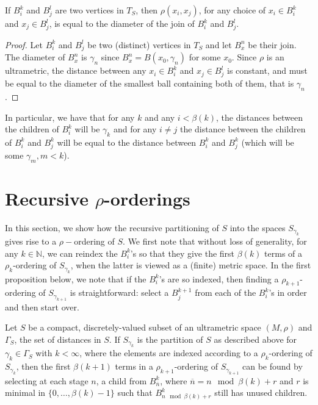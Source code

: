 \begin{lemma}
If $B^k_i$ and $B^l_j$ are two vertices in $T_S$, then $\rho(x_i,x_j)$, for any choice of  $x_i \in B^k_i$ and $x_j \in B^l_j$, is equal to the diameter of the join of  $B^k_i$ and $B^l_j$. 
\end{lemma}

\begin{proof}
Let $B^k_i$ and $B^l_j$ be two (distinct) vertices in $T_S$ and let $B^n_x$ be their join. The diameter of $B^n_x$ is $\gamma_n$ since $B^n_x=B(x_0, \gamma_n)$ for some $x_0$. Since $\rho$ is an ultrametric, the distance between any  $x_i \in B^k_i$ and $x_j \in B^l_j$ is constant, and must be equal to the diameter of the smallest ball containing both of them, that is $\gamma_n$.
\end{proof}

In particular, we have that for any $k$ and any $i < \beta(k)$, the distances between the children of $B^k_i$ will be $\gamma_k$ and for any $i \neq j$ the distance between the children of $B^k_i$ and $B^k_j$ will be equal to the distance between  $B^k_i$ and $B^k_j$ (which will be some $\gamma_{m}, m <k$).\\

\section*{Recursive $\rho$-orderings}
In this section, we show how the recursive partitioning of $S$ into the spaces $S_{\gamma_k}$ gives rise to a $\rho-$ordering of $S$. We first note that without loss of generality, for any $k \in \mathbb{N}$, we can reindex the $B^k_i$'s so that they give the first $\beta(k)$ terms of a $\rho_k$-ordering of $S_{\gamma_k}$, when the latter is viewed as a (finite) metric space. In the first proposition below, we note that if the $B^k_i$'s are so indexed, then finding a $\rho_{k+1}$-ordering of $S_{\gamma_{k+1}}$ is straightforward: select a $B^{k+1}_j$ from each of the $B^k_i$'s in order and then start over.\\  

\begin{proposition} 
Let $S$ be a compact, discretely-valued subset of an ultrametric space $(M, \rho)$ and $\Gamma_S$, the set of distances in $S$. If $S_{\gamma_k}$ is the partition of $S$ as described above for $\gamma_k \in \Gamma_S$ with $k < \infty$, where the elements are indexed according to a $\rho_k$-ordering of $S_{\gamma_k}$, then the first $\beta(k+1)$ terms in a $\rho_{k+1}$-ordering of $S_{\gamma_{k+1}}$ can be found by selecting at each stage $n$, a child from $B^k_{\overline{n}}$, where $\overline{n} = n \mod \beta(k) +r $ and $r$ is minimal in $\{0,\ldots,\beta(k)-1\}$ such that $B^k_{n \mod \beta(k) +r}$ still has unused children.
\end{proposition}


